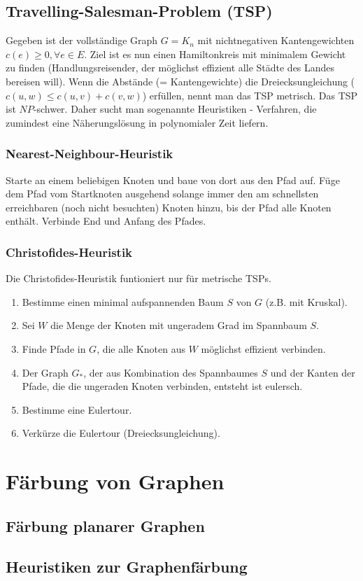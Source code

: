 \documentclass[10pt,a4paper,landscape]{article}
\begin{document}
\begin{multicols*}{2}
    \subsection{ Travelling-Salesman-Problem (TSP) }
    Gegeben ist der vollständige Graph $G = K_n$ mit nichtnegativen Kantengewichten $c(e) \geq 0, \forall e \in E$. Ziel ist es nun einen Hamiltonkreis mit 
    minimalem Gewicht zu finden (Handlungsreisender, der möglichst effizient alle Städte des Landes bereisen will). Wenn die Abstände (= Kantengewichte) die 
    Dreiecksungleichung ($c(u,w) \leq c(u,v) + c(v,w)$) erfüllen, nennt man das TSP metrisch. Das TSP ist $NP$-schwer. Daher sucht man 
    sogenannte Heuristiken - Verfahren, die zumindest eine Näherungslösung in polynomialer Zeit liefern.
    \subsubsection*{ Nearest-Neighbour-Heuristik }
    Starte an einem beliebigen Knoten und baue von dort aus den Pfad auf. Füge dem Pfad vom Startknoten ausgehend solange immer den am schnellsten erreichbaren 
    (noch nicht besuchten) Knoten hinzu, bis der Pfad alle Knoten enthält. Verbinde End und Anfang des Pfades.
    \subsubsection*{ Christofides-Heuristik }
    Die Christofides-Heuristik funtioniert nur für metrische TSPs.
    \begin{enumerate}
        \item Bestimme einen minimal aufspannenden Baum $S$ von $G$ (z.B. mit Kruskal).
        \item Sei $W$ die Menge der Knoten mit ungeradem Grad im Spannbaum $S$.
        \item Finde Pfade in $G$, die alle Knoten aus $W$ möglichst effizient verbinden.
        \item Der Graph $G_*$, der aus Kombination des Spannbaumes $S$ und der Kanten der Pfade, die die ungeraden Knoten verbinden, entsteht ist eulersch.
        \item Bestimme eine Eulertour.
        \item Verkürze die Eulertour (Dreiecksungleichung).
    \end{enumerate}


\section{ Färbung von Graphen }
    \subsection{ Färbung planarer Graphen }

    \subsection{ Heuristiken zur Graphenfärbung }


\end{multicols*}
\end{document}
